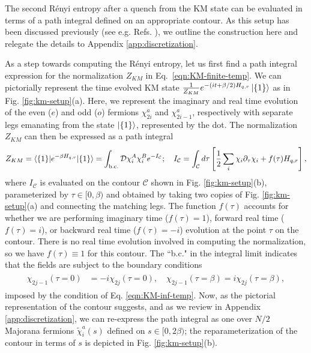 \documentclass[reprint, floatfix,eqsecnum,superscriptaddress,preprint,nofootinbib,onecolumn,amsmath,amssymb,aps,prb]{revtex4-2}
\newcommand{\tchi}{\tilde{\chi}}
\begin{document}
The second R\'enyi entropy after a quench from the KM state can be evaluated in terms of a path integral defined on an appropriate contour. As this setup has been discussed previously (see e.g. Refs. \cite{Zhang2020b,Liu2018}), we outline the construction here and relegate the details to Appendix \ref{app:discretization}. 

As a step towards computing the R\'enyi entropy, let us first find a path integral expression for the normalization $Z_{KM}$ in Eq.~\eqref{eqn:KM-finite-temp}. We can pictorially represent the time evolved KM state $\frac{1}{Z_{KM}} e^{-(it+\beta/2) H_{q,r}} \ket{\{1\}}$ as in Fig. \ref{fig:km-setup}(a). Here, we represent the imaginary and real time evolution of the even ($e$) and odd ($o$) fermions $\chi_{2i}^a$ and $\chi_{2i-1}^a$, respectively with separate legs emanating from the state $\ket{\{1\}}$, represented by the dot. 
The normalization $Z_{KM}$ can then be expressed as a path integral
\begin{align}
	Z_{KM} = \braket{ \{1\} | e^{-\beta H_{q,r}} | \{1\} } = \int_{\mathrm{b.c.}} \mathcal{D}\chi_i^A \chi_i^B e^{- I_{\mathcal{C}} }; \quad
	I_{\mathcal{C}} = \int_{\mathcal{C}} d\tau \left[ \frac{1}{2}\sum_i \chi_i \partial_\tau \chi_i + f(\tau) H_{q,r}\right], \label{eqn:km-action-unaveraged}
\end{align}
where $I_{\mathcal{C}}$ is evaluated on the contour $\mathcal{C}$ shown in Fig. \ref{fig:km-setup}(b), parameterized by $\tau \in [0,\beta)$ and obtained by taking two copies of Fig. \ref{fig:km-setup}(a) and connecting the matching legs.
The function $f(\tau)$ accounts for whether we are performing imaginary time ($f(\tau) = 1$), forward real time ($f(\tau)=i$), or backward real time ($f(\tau) = -i$) evolution at the point $\tau$ on the contour. 
There is no real time evolution involved in computing the normalization, so we have $f(\tau) \equiv 1$ for this contour.
The ``b.c." in the integral limit indicates that the fields are subject to the boundary conditions
\begin{align}
    \begin{split}
	\chi_{2j-1}(\tau = 0) &= -i \chi_{2j}(\tau =  0), \quad	\chi_{2j-1}(\tau =  \beta) = i\chi_{2j}(\tau =  \beta),
	\end{split} \label{eqn:km-bcs}
\end{align}
imposed by the condition of Eq. \eqref{eqn:KM-inf-temp}. 
Now, as the pictorial representation of the contour suggests, and as we review in Appendix \ref{app:discretization}, we can re-express the path integral as one over $N/2$ Majorana fermions $\tchi_i^a(s)$ defined on $s \in [0,2\beta)$; the reparameterization of the contour in terms of $s$ is depicted in Fig. \ref{fig:km-setup}(b).
\end{document}
